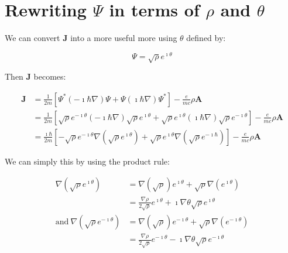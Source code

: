 
\section{Rewriting $\Psi$ in terms of $\rho$ and $\theta$}
\label{sec:rewriting}

We can convert $\mathbf{J}$ into a more useful more using $\theta$ defined by:

\begin{equation}
    \Psi = \sqrt{\rho} e^{\imath \theta}
\end{equation}

Then $\mathbf{J}$ becomes:

\begin{align}
    \mathbf{J} &= \frac{1}{2m} \left[ \Psi^* \left( -\imath \hbar \nabla \right)
    \Psi + \Psi \left( \imath \hbar \nabla \right) \Psi^* \right] - \frac{e}{mc}
    \rho \mathbf{A} \\
    &= \frac{1}{2m} \left[ \sqrt{\rho} e^{-\imath \theta} \left( -\imath \hbar
    \nabla \right) \sqrt{\rho} e^{\imath \theta} + \sqrt{\rho} e^{\imath \theta}
    \left( \imath \hbar \nabla \right) \sqrt{\rho} e^{-\imath \theta} \right] -
    \frac{e}{mc} \rho \mathbf{A} \\
    &= \frac{\imath \hbar}{2m} \left[ -\sqrt{\rho} e^{-\imath \theta} \nabla
    \left( \sqrt{\rho}e^{\imath \theta} \right) + \sqrt{\rho} e^{\imath \theta}
    \nabla \left( \sqrt{\rho} e^{-\imath \hbar} \right) \right] - \frac{e}{mc}
    \rho \mathbf{A}
\end{align}

We can simply this by using the product rule:

\begin{align}
    \nabla \left( \sqrt{\rho} e^{\imath \theta} \right) &= \nabla \left(
    \sqrt{\rho} \right) e^{\imath \theta} + \sqrt{\rho} \nabla \left( e^{\imath
    \theta} \right) \\
    &= \frac{\nabla \rho}{2 \sqrt{\rho}} e^{\imath \theta} + \imath \nabla \theta \sqrt{\rho}
    e^{\imath \theta} \\
    \mathrm{and} ~ \nabla \left( \sqrt{\rho} e^{-\imath \theta} \right) &= \nabla
    \left( \sqrt{\rho} \right) e^{-\imath \theta} + \sqrt{\rho} \nabla \left(
    e^{-\imath \theta} \right) \\
    &= \frac{\nabla \rho}{2 \sqrt{\rho}} e^{-\imath \theta} - \imath \nabla \theta
    \sqrt{\rho} e^{-\imath \theta}
\end{align}


